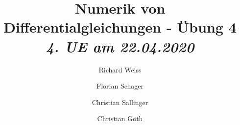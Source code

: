 \documentclass{article}
\title
{
  Numerik von Differentialgleichungen - Übung 4 \\
  \vspace{4pt}
  \normalsize
  \textit{4. UE am 22.04.2020}
}
\author
{
  Richard Weiss       \and
  Florian Schager     \and
  Christian Sallinger \and
  Christian Göth
}
\date{}
\begin{document}
\maketitle



\FloatBarrier



\end{document}
